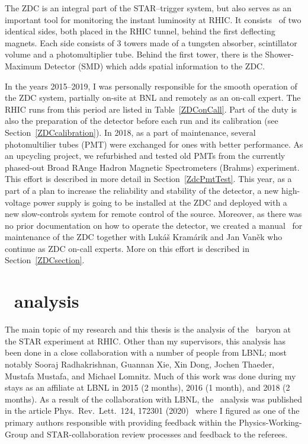 The ZDC is an integral part of the STAR--trigger system, but also serves as an important tool for monitoring the instant luminosity at RHIC\@. It consists~\cite{ZDC, ZDCSMD} of two identical sides, both placed in the RHIC tunnel, behind 
the first deflecting magnets. Each side consists of 3 towers made of a tungsten absorber, scintillator volume and a photomultiplier tube.
Behind the first tower, there is the Shower-Maximum Detector (SMD) which adds spatial information to the ZDC\@.

In the years 2015--2019, I was personally responsible for the smooth operation of the ZDC system, partially on-site at BNL and remotely as an on-call expert. The RHIC runs from this period are listed in Table~\ref{ZDConCall}\@. Part of the duty is also the preparation of the detector before each run and its calibration (see Section~\ref{ZDCcalibration}). In 2018, as a part of  maintenance, several photomultilier tubes (PMT) were exchanged for ones with better performance. As an upcycling project, we refurbished and tested old PMTs from the currently phased-out Broad RAnge Hadron Magnetic Spectrometers (Brahms) experiment. This effort is described in more detail in Section~\ref{ZdcPmtTest}\@. This year, as a part of a plan to increase the reliability and stability of the detector, a new high-voltage power supply is going to be installed at the ZDC and deployed with a new slow-controls system for remote control of the source. Moreover, as there was no prior documentation on how to operate the detector, we created a manual~\cite{ZDCmanual} for maintenance of the ZDC together with Lukáš Kramárik and Jan Vaněk who continue as ZDC on-call experts. More on this effort is described in Section~\ref{ZDCsection}\@.





\section*{\Lambdac\ analysis}
The main topic of my research and this thesis is the analysis of the \Lambdac\ baryon at the STAR experiment at RHIC\@. Other than my supervisors, this analysis has been done in a close collaboration with a number of people from LBNL; most notably Sooraj Radhakrishnan, Guannan Xie, Xin Dong, Jochen Thaeder, Mustafa Mustafa, and Michael Lomnitz. Much of this work was done during my stays as an affiliate at LBNL in 2015 (2 months), 2016 (1 month), and 2018 (2 months)\@. 
As a result of the collaboration with LBNL, the \Lambdac\ analysis was published in the article Phys.\ Rev.\ Lett.\ 124, 172301 (2020)~\cite{LambdacPaper} where I figured as one of the primary authors responsible with providing feedback within the Physics-Working-Group and STAR-collaboration review processes and feedback to the referees.

